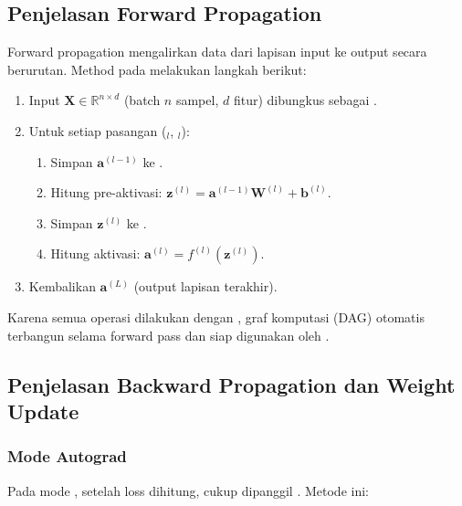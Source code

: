 \subsection{Penjelasan Forward Propagation}

Forward propagation mengalirkan data dari lapisan input ke output secara
berurutan. Method  pada  melakukan langkah berikut:

\begin{enumerate}
    \item Input $\mathbf{X} \in \mathbb{R}^{n \times d}$ (batch $n$ sampel,
          $d$ fitur) dibungkus sebagai .
    \item Untuk setiap pasangan ($_l$, $_l$):
    \begin{enumerate}
        \item Simpan $\mathbf{a}^{(l-1)}$ ke .
        \item Hitung pre-aktivasi: $\mathbf{z}^{(l)} = \mathbf{a}^{(l-1)}\mathbf{W}^{(l)} + \mathbf{b}^{(l)}$.
        \item Simpan $\mathbf{z}^{(l)}$ ke .
        \item Hitung aktivasi: $\mathbf{a}^{(l)} = f^{(l)}(\mathbf{z}^{(l)})$.
    \end{enumerate}
    \item Kembalikan $\mathbf{a}^{(L)}$ (output lapisan terakhir).
\end{enumerate}

Karena semua operasi dilakukan dengan , graf komputasi (DAG)
otomatis terbangun selama forward pass dan siap digunakan oleh
.

\subsection{Penjelasan Backward Propagation dan Weight Update}

\subsubsection{Mode Autograd}

Pada mode , setelah loss dihitung, cukup dipanggil
. Metode ini:

